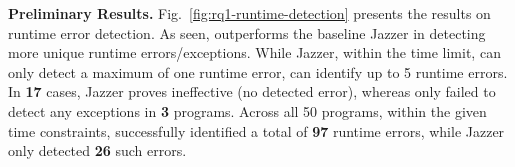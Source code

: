 


{\bf Preliminary Results.} Fig.~\ref{fig:rq1-runtime-detection}
presents the results on runtime error detection. As seen, {\tool}
outperforms the baseline Jazzer in detecting more unique runtime
errors/exceptions. While Jazzer, within the time limit, can only
detect a maximum of one runtime error, {\tool} can identify up to 5
runtime errors. In {\bf 17} cases, Jazzer proves ineffective (no
detected error), whereas {\tool} only failed to detect any exceptions
in {\bf 3} programs. Across all 50 programs, within the given time
constraints, {\tool} successfully identified a total of {\bf 97}
runtime errors, while Jazzer only detected {\bf 26} such errors.




